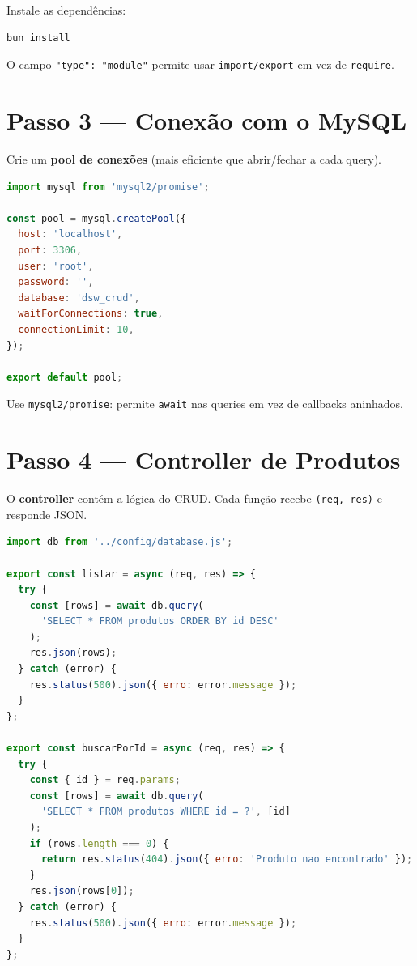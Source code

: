 \documentclass[11pt,a4paper]{article}
\begin{document}
Instale as dependências:

\begin{lstlisting}[language=bash]
bun install
\end{lstlisting}

\begin{caixa-atencao}
O campo \texttt{"type": "module"} permite usar \texttt{import/export} em vez de \texttt{require}.
\end{caixa-atencao}

\section{Passo 3 --- Conexão com o MySQL}

Crie um \textbf{pool de conexões} (mais eficiente que abrir/fechar a cada query).

\begin{lstlisting}[language=JavaScript, caption={\texttt{backend/src/config/database.js}}]
import mysql from 'mysql2/promise';

const pool = mysql.createPool({
  host: 'localhost',
  port: 3306,
  user: 'root',
  password: '',
  database: 'dsw_crud',
  waitForConnections: true,
  connectionLimit: 10,
});

export default pool;
\end{lstlisting}

\begin{caixa-dica}
Use \texttt{mysql2/promise}: permite \texttt{await} nas queries em vez de callbacks aninhados.
\end{caixa-dica}

\section{Passo 4 --- Controller de Produtos}

O \textbf{controller} contém a lógica do CRUD. Cada função recebe \texttt{(req, res)} e responde JSON.

\begin{lstlisting}[language=JavaScript, caption={\texttt{backend/src/controllers/produtoController.js (parte 1)}}]
import db from '../config/database.js';

export const listar = async (req, res) => {
  try {
    const [rows] = await db.query(
      'SELECT * FROM produtos ORDER BY id DESC'
    );
    res.json(rows);
  } catch (error) {
    res.status(500).json({ erro: error.message });
  }
};

export const buscarPorId = async (req, res) => {
  try {
    const { id } = req.params;
    const [rows] = await db.query(
      'SELECT * FROM produtos WHERE id = ?', [id]
    );
    if (rows.length === 0) {
      return res.status(404).json({ erro: 'Produto nao encontrado' });
    }
    res.json(rows[0]);
  } catch (error) {
    res.status(500).json({ erro: error.message });
  }
};
\end{lstlisting}
\end{document}
